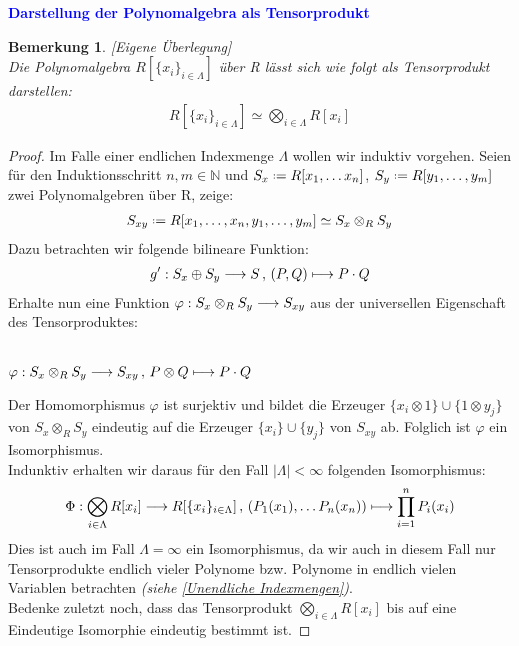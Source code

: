 \documentclass[10pt,a4paper]{report}
\newcounter{Aussage}[chapter]
\newtheorem{bem}[Aussage]{Bemerkung}
\newcommand{\functionfront}[3]{\nolinebreak{#1:#2 \longrightarrow #3}}
\newcommand{\function}[5]{\nolinebreak{#1:#2 \longrightarrow #3 \, , \, #4 \longmapsto #5}}
\newcommand{\Tensor}[3]{#1 \otimes_{#2} #3}
\newcommand{\tensor}[3]{#1 \otimes #3}
\newcommand*{\defeq}{\mathrel{\vcenter{\baselineskip0.5ex \lineskiplimit0pt
                     \hbox{\scriptsize.}\hbox{\scriptsize.}}}%
                     =}
\begin{document}
\textcolor{blue}{\textbf{Darstellung der Polynomalgebra als Tensorprodukt}}
\begin{bem}\label{Darstellung der Polynomalgebra als Tensorprodukt}\textit{[Eigene Überlegung]}\\
Die Polynomalgebra $R[\lbrace x_i \rbrace_{i \in \Lambda}]$ über R lässt sich wie folgt als Tensorprodukt darstellen:
\begin{gather*}
R[\lbrace x_i \rbrace_{i \in  \Lambda}] \simeq \bigotimes_{i \in \Lambda} R[x_i]
\end{gather*}
\end{bem}
\begin{proof}
Im Falle einer endlichen Indexmenge $\Lambda$ wollen wir induktiv vorgehen. Seien für den Induktionsschritt $n,m \in \mathbb{N}$ und $\nolinebreak{S_x \defeq R[x_1, \dots x_n]}$, $\nolinebreak{S_y \defeq R[y_1, \dots , y_m]}$ zwei Polynomalgebren über R, zeige:
\begin{gather*}
S_{xy} \defeq R[x_1, \dots , x_n, y_1 , \dots , y_m] \simeq \Tensor{S_x}{R}{S_y}
\end{gather*}
Dazu betrachten wir folgende bilineare Funktion:
\begin{gather*}
\function{g'}{S_x \oplus S_y}{S}{(P,Q)}{P \cdot Q}
\end{gather*}
Erhalte nun eine Funktion $\functionfront{\varphi}{\Tensor{S_x}{R}{S_y}}{S_{xy}}$ aus der universellen Eigenschaft des Tensorproduktes:
\begin{center}
\ \\
$\function{\varphi}{\Tensor{S_x}{R}{S_y}}{S_{xy}}{\tensor{P}{R}{Q}}{P \cdot Q}$
\end{center}
Der Homomorphismus $\varphi$ ist surjektiv und bildet die Erzeuger $\lbrace \tensor{x_i}{R}{1} \rbrace \cup \lbrace \tensor{1}{R}{y_j} \rbrace$ von $\Tensor{S_x}{R}{S_y}$ eindeutig auf die Erzeuger $\lbrace x_i \rbrace \cup \lbrace y_j \rbrace$ von $S_{xy}$ ab. Folglich ist $\varphi$ ein Isomorphismus.\\
Indunktiv erhalten wir daraus für den Fall $\vert \Lambda \vert < \infty$ folgenden Isomorphismus:
\begin{gather*}
\function{\Phi}{\bigotimes_{i \in \Lambda} R[x_i]}{R[\lbrace x_i \rbrace_{i \in \Lambda} ]}{(P_1(x_1), \dots P_n(x_n))}{\prod_{i=1}^{n} P_i(x_i)}
\end{gather*}
Dies ist auch im Fall $\Lambda = \infty$ ein Isomorphismus, da wir auch in diesem Fall nur Tensorprodukte endlich vieler Polynome bzw. Polynome in endlich vielen Variablen betrachten \textit{(siehe \cref{Unendliche Indexmengen})}.\\
Bedenke zuletzt noch, dass das Tensorprodukt $\bigotimes_{i \in \Lambda} R[x_i]$ bis auf eine Eindeutige Isomorphie eindeutig bestimmt ist.
\end{proof}
\end{document}

